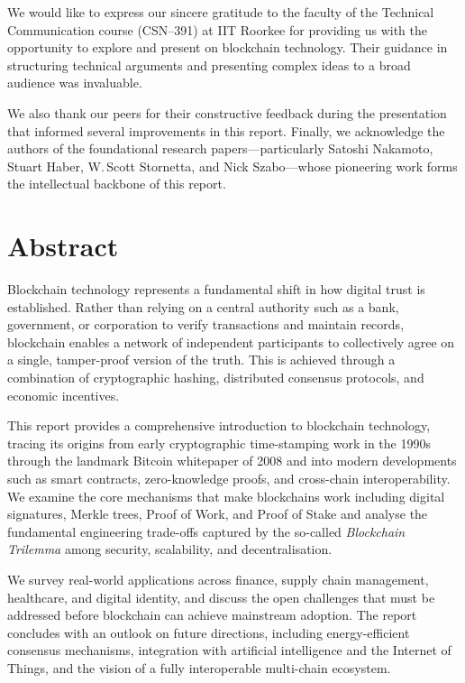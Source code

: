 We would like to express our sincere gratitude to the faculty of the Technical Communication course (CSN--391) at IIT Roorkee for providing us with the opportunity to explore and present on blockchain technology. Their guidance in structuring technical arguments and presenting complex ideas to a broad audience was invaluable.

We also thank our peers for their constructive feedback during the presentation that informed several improvements in this report. Finally, we acknowledge the authors of the foundational research papers---particularly Satoshi Nakamoto, Stuart Haber, W.\,Scott Stornetta, and Nick Szabo---whose pioneering work forms the intellectual backbone of this report.

\clearpage
\chapter*{Abstract}

Blockchain technology represents a fundamental shift in how digital trust is established. Rather than relying on a central authority such as a bank, government, or corporation to verify transactions and maintain records, blockchain enables a network of independent participants to collectively agree on a single, tamper-proof version of the truth. This is achieved through a combination of cryptographic hashing, distributed consensus protocols, and economic incentives.

This report provides a comprehensive introduction to blockchain technology, tracing its origins from early cryptographic time-stamping work in the 1990s through the landmark Bitcoin whitepaper of 2008 and into modern developments such as smart contracts, zero-knowledge proofs, and cross-chain interoperability. We examine the core mechanisms that make blockchains work including digital signatures, Merkle trees, Proof of Work, and Proof of Stake and analyse the fundamental engineering trade-offs captured by the so-called \emph{Blockchain Trilemma} among security, scalability, and decentralisation.

We survey real-world applications across finance, supply chain management, healthcare, and digital identity, and discuss the open challenges that must be addressed before blockchain can achieve mainstream adoption. The report concludes with an outlook on future directions, including energy-efficient consensus mechanisms, integration with artificial intelligence and the Internet of Things, and the vision of a fully interoperable multi-chain ecosystem.

